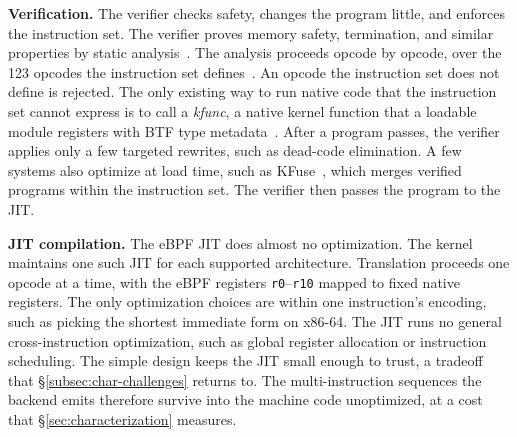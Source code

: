 \noindent\textbf{Verification.}
The verifier checks safety, changes the program little, and enforces the instruction set.
The verifier proves memory safety, termination, and similar properties by static analysis~\cite{gershuni2019simple}.
The analysis proceeds opcode by opcode, over the 123 opcodes the instruction set defines~\cite{rfc9669}.
An opcode the instruction set does not define is rejected.
The only existing way to run native code that the instruction set cannot express is to call a \emph{kfunc}, a native kernel function that a loadable module registers with BTF type metadata~\cite{kfuncs}.
After a program passes, the verifier applies only a few targeted rewrites, such as dead-code elimination.
A few systems also optimize at load time, such as KFuse~\cite{kfuse}, which merges verified programs within the instruction set.
The verifier then passes the program to the JIT.

\noindent\textbf{JIT compilation.}
The eBPF JIT does almost no optimization.
The kernel maintains one such JIT for each supported architecture.
Translation proceeds one opcode at a time, with the eBPF registers \texttt{r0}--\texttt{r10} mapped to fixed native registers.
The only optimization choices are within one instruction's encoding, such as picking the shortest immediate form on x86-64.
The JIT runs no general cross-instruction optimization, such as global register allocation or instruction scheduling.
The simple design keeps the JIT small enough to trust, a tradeoff that \S\ref{subsec:char-challenges} returns to.
The multi-instruction sequences the backend emits therefore survive into the machine code unoptimized, at a cost that \S\ref{sec:characterization} measures.
